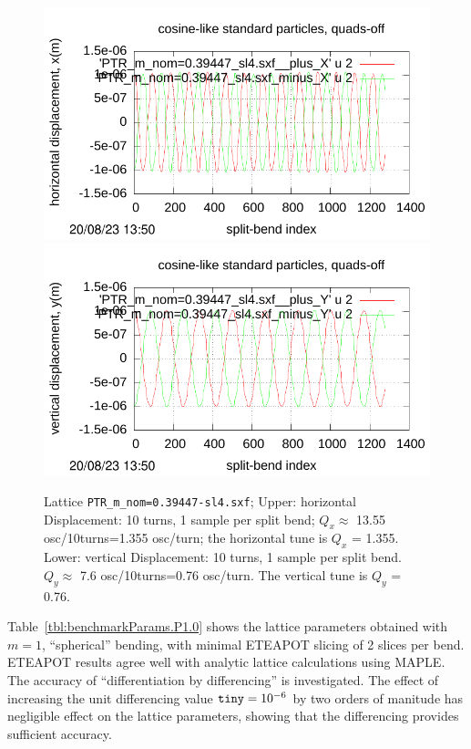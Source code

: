 \documentclass[12pt]{article}
\begin{document}
\begin{figure}[htbp]
  \includegraphics[scale=0.6]{pdf/Fig-p39-t.pdf}
  \includegraphics[scale=0.6]{pdf/Fig-p39-b.pdf} 
\caption{Lattice {\tt PTR\_m\_nom=0.39447-sl4.sxf}; Upper: horizontal Displacement: 10 turns, 
1 sample per split bend; $Q_x\approx$ 13.55 osc/10turns=1.355 osc/turn; the horizontal tune is $Q_x$ = 1.355. 
Lower: vertical Displacement: 10 turns, 1 sample per split bend. $Q_y\approx$ 
7.6 osc/10turns=0.76 osc/turn. The vertical tune is $Q_y$ = 0.76.}
\end{figure}
%
%
Table~\ref{tbl:benchmarkParams.P1.0} shows the lattice parameters obtained
with $m=1$, ``spherical'' bending, with minimal ETEAPOT slicing of 2 slices per bend.
ETEAPOT results agree well with analytic lattice calculations using MAPLE. The 
accuracy of ``differentiation by differencing'' is investigated. The effect of
increasing the unit differencing value ${\tt tiny}=10^{-6}$ by two orders of manitude
has negligible effect on the lattice parameters, showing that the differencing provides
sufficient accuracy.
\end{document}
